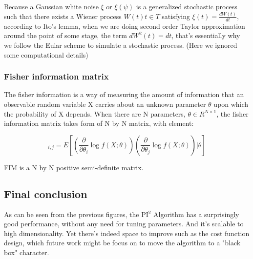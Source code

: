 \documentclass[journal]{IEEEtran}
\begin{document}
Because a Gaussian white noise $\xi$ or $\xi(\psi)$ is a generalized stochastic process such that there exists a Wiener process $W(t) t\in T$ satisfying $\xi(t) = \frac{dW(t)}{dt}$, according to Ito's
lemma, when we are doing second order Taylor approximation around the point of some stage, the term $dW^2(t) = dt$, that's essentially why we follow the Eular scheme to simulate a stochastic process. (Here we ignored some computational details) 


\subsubsection{Fisher information matrix}

The fisher information is a way of measuring the amount of information that an observable random variable X carries about an unknown parameter $\theta$ upon which the probability of X depends.
When there are N parameters, $\theta \in R^{N \times 1}$, the fisher information matrix takes form of N by N matrix,
with element:

\begin{equation}
  [I(\theta)]_{i,j} = E[(\frac{\partial}{\partial \theta_i} \log f(X ; \theta))(\frac{\partial}{\partial \theta_j} \log f(X ; \theta))| \theta] \nonumber
\end{equation}

FIM is a N by N positive semi-definite matrix.


\subsection{Final conclusion}

As can be seen from the previous figures, the PI$^2$ Algorithm has a surprisingly good performance, without any need for tuning parameters. And it's scalable to high dimensionality.
Yet there's indeed space to improve such as the cost function design, which future work might be focus on to move the algorithm to a "black box" character.

\end{document}
